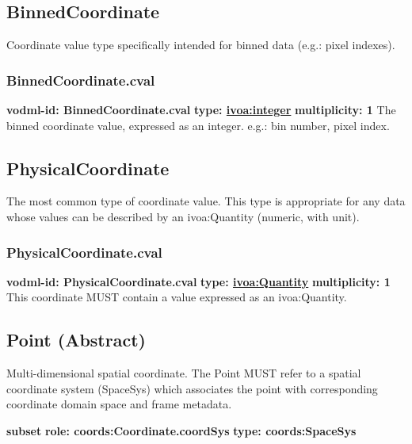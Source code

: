   \subsection{BinnedCoordinate}
  \label{sect:BinnedCoordinate}
    Coordinate value type specifically intended for binned data (e.g.: pixel indexes).

    \subsubsection{BinnedCoordinate.cval}
      \textbf{vodml-id: BinnedCoordinate.cval} \newline
      \textbf{type: \hyperref[sect:ivoa]{ivoa:integer}} \newline
      \textbf{multiplicity: 1} \newline 
      The binned coordinate value, expressed as an integer. e.g.: bin number, pixel index.


  \subsection{PhysicalCoordinate}
  \label{sect:PhysicalCoordinate}
    The most common type of coordinate value. This type is appropriate for any data whose values can be described by an ivoa:Quantity (numeric, with unit).

    \subsubsection{PhysicalCoordinate.cval}
      \textbf{vodml-id: PhysicalCoordinate.cval} \newline
      \textbf{type: \hyperref[sect:ivoa]{ivoa:Quantity}} \newline
      \textbf{multiplicity: 1} \newline 
      This coordinate MUST contain a value expressed as an ivoa:Quantity.


  \subsection{Point (Abstract)}
  \label{sect:Point}
    Multi-dimensional spatial coordinate. The Point MUST refer to a spatial coordinate system (SpaceSys) which associates the point with corresponding coordinate domain space and frame metadata.

    \noindent \textbf{subset} \newline
    \indent   \textbf{role: coords:Coordinate.coordSys} \newline
    \indent   \textbf{type: coords:SpaceSys} \newline


